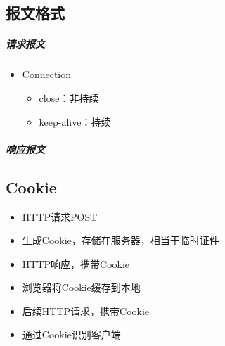 \subsection{报文格式}

\subparagraph{请求报文}
\begin{itemize}
    \item Connection\begin{itemize}
        \item close：非持续
        \item keep-alive：持续
    \end{itemize}
\end{itemize}

\subparagraph{响应报文}


\subsection{Cookie}

\begin{itemize}
    \item HTTP请求POST
    \item 生成Cookie，存储在服务器，相当于临时证件
    \item HTTP响应，携带Cookie
    \item 浏览器将Cookie缓存到本地
    \item 后续HTTP请求，携带Cookie
    \item 通过Cookie识别客户端
\end{itemize}

